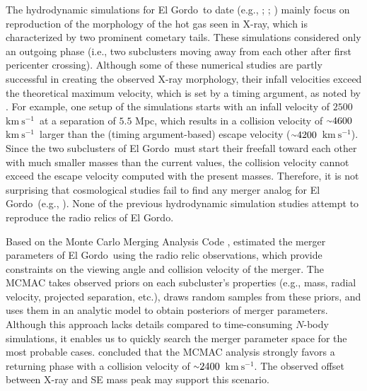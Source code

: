\documentclass[twocolumn]{aastex631}
\newcommand{\elgordo}{El Gordo}
\newcommand{\mytilde}{\raise.19ex\hbox{$\scriptstyle\sim$}}
\newcommand{\kms}{$\mbox{km}~\mbox{s}^{-1}$}
\begin{document}
The hydrodynamic simulations for \elgordo~to date (e.g., \citealt{Donnert2014}; \citealt{Molnar2015}; \citealt{Zhang2015}) mainly focus on reproduction of the morphology of the hot gas seen in X-ray, which is characterized by two prominent cometary tails. These simulations considered only an outgoing phase (i.e., two subclusters moving away from each other after first pericenter crossing). 
Although some of these numerical studies are partly successful in creating the observed X-ray morphology, their infall velocities exceed the theoretical maximum velocity, which is set by a timing argument, as noted by \cite{Ng2015}. 
For example, one setup of the \cite{Zhang2015} simulations starts with an infall velocity of $2500$~\kms~at a separation of $5.5$ Mpc, which results in a collision velocity of $\mytilde4600$~\kms~larger than the (timing argument-based) escape velocity ($\mytilde4200$~\kms). 
Since the two subclusters of \elgordo~must start their freefall toward each other with much smaller masses than the current values, the collision velocity cannot exceed the escape velocity computed with the present masses. 
Therefore, it is not surprising that cosmological studies fail to find any merger analog for \elgordo~(e.g., \citealt{Asencio2021}). 
None of the previous hydrodynamic simulation studies attempt to reproduce the radio relics of \elgordo. 


Based on the Monte Carlo Merging Analysis Code \citep[MCMAC;][]{MCMAC}, \cite{Ng2015} estimated the merger parameters of \elgordo~using the radio relic observations, which provide constraints on the viewing angle and collision velocity of the merger. 
The MCMAC takes observed priors on each subcluster's properties (e.g., mass, radial velocity, projected separation, etc.), draws random samples from these priors, and uses them in an analytic model to obtain posteriors of merger parameters. 
Although this approach lacks details compared to time-consuming $N$-body simulations, it enables us to quickly search the merger parameter space for the most probable cases. 
\cite{Ng2015} concluded that the MCMAC analysis strongly favors a returning phase with a collision velocity of $\mytilde2400$~\kms. The observed offset between X-ray and SE mass peak may support this scenario.
\end{document}
